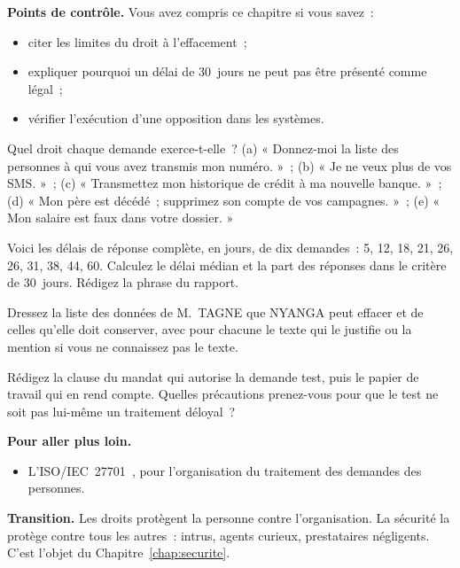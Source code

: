 \begin{boxinfo}
\textbf{Points de contrôle.} Vous avez compris ce chapitre si vous savez~:
\begin{itemize}
    \item citer les limites du droit à l'effacement~;
    \item expliquer pourquoi un délai de 30~jours ne peut pas être présenté
          comme légal~;
    \item vérifier l'exécution d'une opposition dans les systèmes.
\end{itemize}
\end{boxinfo}

\begin{boxexo}[title={\ding{45}\quad Exercice~11.1. Quel droit \niveaubase}]
Quel droit chaque demande exerce-t-elle~? (a) « Donnez-moi la liste des
personnes à qui vous avez transmis mon numéro. »~; (b) « Je ne veux plus de
vos SMS. »~; (c) « Transmettez mon historique de crédit à ma nouvelle
banque. »~; (d) « Mon père est décédé~; supprimez son compte de vos
campagnes. »~; (e) « Mon salaire est faux dans votre dossier. »
\end{boxexo}

\begin{boxexo}[title={\ding{45}\quad Exercice~11.2. Mesurer les délais \niveaumoyen}]
Voici les délais de réponse complète, en jours, de dix demandes~: 5, 12,
18, 21, 26, 26, 31, 38, 44, 60. Calculez le délai médian et la part des
réponses dans le critère de 30~jours. Rédigez la phrase du rapport.
\end{boxexo}

\begin{boxexo}[title={\ding{45}\quad Exercice~11.3. L'effacement de M. TAGNE \niveaumoyen}]
Dressez la liste des données de M.~TAGNE que NYANGA peut effacer et de
celles qu'elle doit conserver, avec pour chacune le texte qui le justifie
ou la mention \NEK{} si vous ne connaissez pas le texte.
\end{boxexo}

\begin{boxexo}[title={\ding{45}\quad Exercice~11.4. La demande test \niveauexpert}]
Rédigez la clause du mandat qui autorise la demande test, puis le papier de
travail qui en rend compte. Quelles précautions prenez-vous pour que le
test ne soit pas lui-même un traitement déloyal~?
\end{boxexo}

\bigskip

\begin{boxinfo}
\textbf{Pour aller plus loin.}
\begin{itemize}
    \item L'ISO/IEC~27701~\cite{iso27701}, pour l'organisation du traitement
          des demandes des personnes.
\end{itemize}
\end{boxinfo}

\begin{boxinfo}
\textbf{Transition.} Les droits protègent la personne contre l'organisation.
La sécurité la protège contre tous les autres~: intrus, agents curieux,
prestataires négligents. C'est l'objet du Chapitre~\ref{chap:securite}.
\end{boxinfo}
